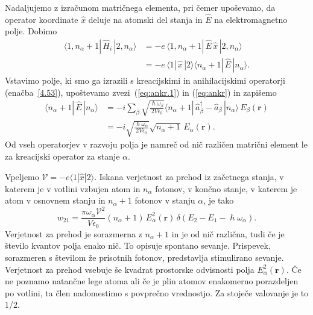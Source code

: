 Nadaljujemo z izračunom matričnega elementa, pri čemer upoševamo, da operator koordinate
$\hat{x}$ deluje na atomski del stanja in $\hat{E}$ na elektromagnetno
polje. Dobimo
\begin{align}
\langle1,n_{\alpha}+1|\,\hat{H}_{i}\,|2,n_{\alpha}\rangle & =  -e\,
\langle1,n_{\alpha}+1|\,\hat{E}\,\hat{x}\,|2,n_{\alpha}\rangle \\
 & =  -e\,\langle1|\,\hat{x}\,|2\rangle\langle n_{\alpha}+1|\,\hat{E}\,|n_{\alpha}\rangle.
\end{align}
Vstavimo polje, ki smo ga izrazili s kreacijskimi in anihilacijskimi operatorji (enačba~\ref{4.53}),
upoštevamo zvezi~(\ref{eq:ankr.1}) in (\ref{eq:ankr}) in zapišemo
\begin{align}
\langle n_{\alpha}+1|\, \hat{E}\,|n_{\alpha}\rangle & = 
 -i\sum_{\beta}\sqrt{\frac{\hslash\omega_{\beta}}{2V\epsilon_{0}}}
\langle n_{\alpha}+1|\,\hat{a}_{\beta}^{\dagger}-\hat{a}_{\beta}\,|n_{\alpha}\rangle\, 
E_{\beta}(\mathbf{r})\nonumber \\
 & =  -i\sqrt{\frac{\hslash\omega_{\alpha}}{2V\epsilon_{0}}}
 \sqrt{n_{\alpha}+1}\, E_{\alpha}(\mathbf{r}).
\end{align}
Od vseh operatorjev v razvoju polja je namreč od nič različen matrični
element le za kreacijski operator za stanje $\alpha$.

Vpeljemo $\mathcal{V} = -e \langle1|\hat{x}|2\rangle$.
 Iskana verjetnost za prehod iz 
začetnega stanja, v katerem je v votlini vzbujen atom in $n_{\alpha}$ fotonov, v končno
stanje, v katerem je atom v osnovnem stanju in $n_{\alpha}+1$ fotonov v stanju $\alpha$, je tako
\begin{equation}
w_{21}=\frac{\pi \omega_{\alpha}\mathcal{V}^{2}}{V\epsilon_{0}}
(n_{\alpha}+1)\,E_{\alpha}^{2}(\mathbf{r})\,\delta(E_{2}-E_{1}-\hslash\omega_{\alpha}).
\label{4.56}
\end{equation}
Verjetnost za prehod je sorazmerna z $n_{\alpha}+1$ in je od nič
različna, tudi če je število kvantov polja enako nič. To opisuje 
spontano sevanje. Prispevek, sorazmeren 
s številom že prisotnih fotonov, predstavlja stimulirano 
sevanje. Verjetnost za prehod vsebuje
še kvadrat prostorske odvisnosti polja $E_{\alpha}^{2}(\mathbf{r})$.
Če ne poznamo natančne lege atoma ali če je plin atomov enakomerno
porazdeljen po votlini, ta člen nadomestimo s povprečno vrednostjo.
Za stoječe valovanje je to 1/2.

